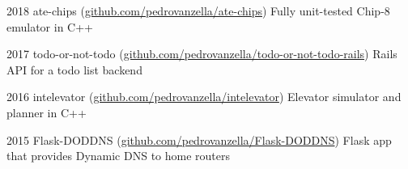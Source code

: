 \documentclass{tccv}
\begin{document}
    \begin{yearlist}

    \item{2018}
      {ate-chips \newline (\href{https://github.com/pedrovanzella/ate-chips}{github.com/pedrovanzella/ate-chips})}
      {Fully unit-tested Chip-8 emulator in C++}

    \item{2017}
      {todo-or-not-todo \newline (\href{https://github.com/pedrovanzella/todo-or-not-todo-rails}{github.com/pedrovanzella/todo-or-not-todo-rails})}
      {Rails API for a todo list backend}

    \item{2016}
      {intelevator \newline (\href{https://github.com/vantas/intelevator}{github.com/pedrovanzella/intelevator})}
      {Elevator simulator and planner in C++}
      
    \item{2015}
      {Flask-DODDNS \newline (\href{https://github.com/pedrovanzella/Flask-DODDNS}{github.com/pedrovanzella/Flask-DODDNS})}
      {Flask app that provides Dynamic DNS to home routers}

    \end{yearlist}
\end{document}
